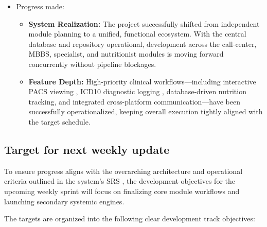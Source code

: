 \documentclass[onecolumn,journal]{IEEEtran}
\begin{document}
\begin{itemize}
		\item Progress made:
		\begin{itemize}
			\item \textbf{System Realization:} The project successfully shifted from independent module planning to a unified, functional ecosystem. With the central database and repository operational, development across the call-center, MBBS, specialist, and nutritionist modules is moving forward concurrently without pipeline blockages.
			\item \textbf{Feature Depth:} High-priority clinical workflows—including interactive PACS viewing \cite{pacs2001}, ICD10 diagnostic logging \cite{who2016icd10}, database-driven nutrition tracking, and integrated cross-platform communication—have been successfully operationalized, keeping overall execution tightly aligned with the target schedule.
		\end{itemize}
		
	\end{itemize}
	\subsection{Target for next weekly update}
	
	To ensure progress aligns with the overarching architecture and operational criteria outlined in the system's SRS \cite{srs2026}, the development objectives for the upcoming weekly sprint will focus on finalizing core module workflows and launching secondary systemic engines. 
	
	The targets are organized into the following clear development track objectives:
	
\end{document}
